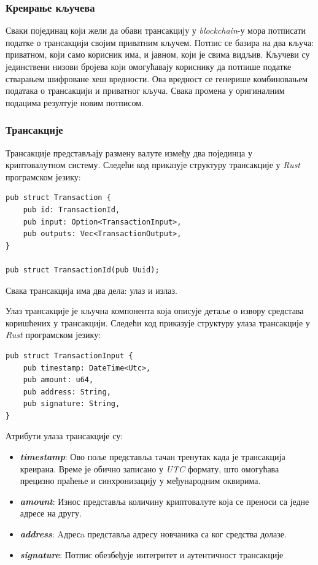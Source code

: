 \documentclass[12pt, a4paper]{article}
\begin{document}
\subsubsection{Креирање кључева}
Сваки појединац који жели да обави трансакцију у \textit{blockchain}-у мора потписати податке о трансакцији својим приватним кључем. Потпис се базира на два кључа: приватном, који само корисник има, и јавном, који је свима видљив. Кључеви су јединствени низови бројева који омогућавају кориснику да потпише податке стварањем шифроване хеш вредности. Ова вредност се генерише комбиновањем података о трансакцији и приватног кључа. Свака промена у оригиналним подацима резултује новим потписом.

\subsubsection{Трансакције}
Трансакције представљају размену валуте између два појединца у криптовалутном систему.  Следећи код приказује структуру трансакције у \textit{Rust} програмском језику:

\begin{verbatim}
pub struct Transaction {
    pub id: TransactionId,
    pub input: Option<TransactionInput>,
    pub outputs: Vec<TransactionOutput>,
}

pub struct TransactionId(pub Uuid);

\end{verbatim}

Свака трансакција има два дела: улаз и излаз. 

Улаз трансакције је кључна компонента која описује детаље о извору средстава коришћених у трансакцији. Следећи код приказује структуру улаза трансакције у \textit{Rust} програмском језику:
\begin{verbatim}
pub struct TransactionInput {
    pub timestamp: DateTime<Utc>,
    pub amount: u64,
    pub address: String,
    pub signature: String,
}
\end{verbatim}

Атрибути улаза трансакције су:
\begin{itemize}
    \item \textbf{\textit{timestamp}}: Ово поље представља тачан тренутак када је трансакција креирана. Време је обично записано у \textit{UTC} формату, што омогућава прецизно праћење и синхронизацију у међународним оквирима.
    \item \textbf{\textit{amount}}: Износ представља количину криптовалуте која се преноси са једне адресе на другу. 
    \item \textbf{\textit{address}}: Aдресa представља адресу новчаника са ког средства долазе.
    \item \textbf{\textit{signature}}: Потпис обезбеђује интегритет и аутентичност трансакције
\end{itemize}
\end{document}
